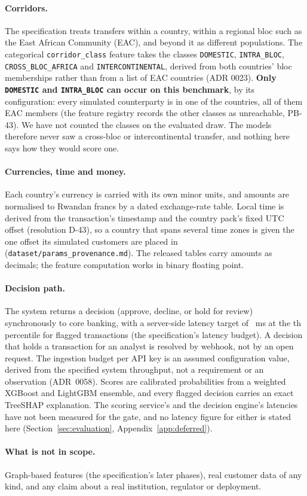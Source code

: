 \paragraph{Corridors.} The specification treats transfers within a country, within a regional bloc
such as the East African Community (EAC), and beyond it as different populations. The categorical
\texttt{corridor\_class} feature takes the classes \texttt{DOMESTIC}, \texttt{INTRA\_BLOC},
\texttt{CROSS\_BLOC\_AFRICA} and \texttt{INTERCONTINENTAL}, derived from both countries' bloc
memberships rather than from a list of EAC countries (ADR 0023). \textbf{Only \texttt{DOMESTIC} and
\texttt{INTRA\_BLOC} can occur on this benchmark}, by its configuration: every simulated counterparty
is in one of the \nCountries{} countries, all of them EAC members (the feature registry records the
other classes as unreachable, PB-43). We have not counted the classes on the evaluated draw. The
models therefore never saw a cross-bloc or intercontinental transfer, and nothing here says how they
would score one.

\paragraph{Currencies, time and money.} Each country's currency is carried with its own minor units,
and amounts are normalised to Rwandan francs by a dated exchange-rate table. Local time is derived
from the transaction's timestamp and the country pack's fixed UTC offset (resolution D-43), so a
country that spans several time zones is given the one offset its simulated customers are placed in
(\texttt{dataset/params\_provenance.md}). The released tables carry amounts as decimals; the feature
computation works in binary floating point.

\paragraph{Decision path.} The system returns a decision (approve, decline, or hold for review)
synchronously to core banking, with a server-side latency target of \nLatencyTargetFlagged{}~ms at
the \nPctlFlag{}th percentile for flagged transactions (the specification's latency budget). A decision that
holds a transaction for an analyst is resolved by webhook, not by an open request. The ingestion
budget per API key is an assumed configuration value, derived from the specified system throughput,
not a requirement or an observation (ADR~0058). Scores are calibrated probabilities from a weighted
XGBoost and LightGBM ensemble, and every flagged decision carries an exact TreeSHAP explanation. The
scoring service's and the decision engine's latencies have not been measured for the gate, and no
latency figure for either is stated here (Section~\ref{sec:evaluation},
Appendix~\ref{app:deferred}).

\paragraph{What is not in scope.} Graph-based features (the specification's later phases),
real customer data of any kind, and any claim about a real institution, regulator or deployment.
